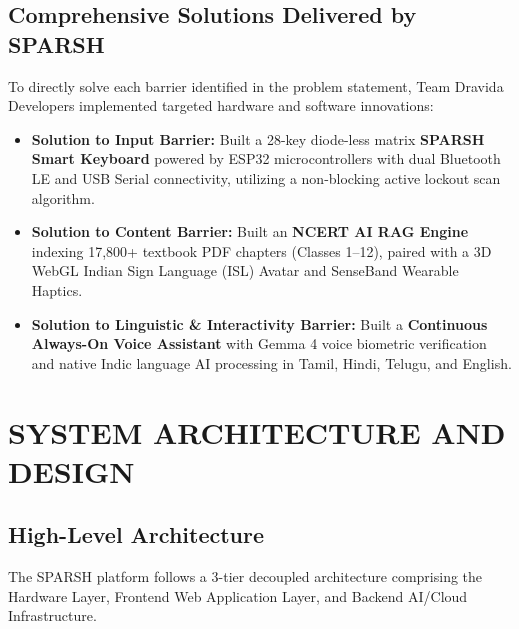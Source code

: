 \documentclass[12pt,a4paper]{report}
\begin{document}
\section{Comprehensive Solutions Delivered by SPARSH}
To directly solve each barrier identified in the problem statement, Team Dravida Developers implemented targeted hardware and software innovations:
\begin{itemize}
    \item \textbf{Solution to Input Barrier:} Built a 28-key diode-less matrix \textbf{SPARSH Smart Keyboard} powered by ESP32 microcontrollers with dual Bluetooth LE and USB Serial connectivity, utilizing a non-blocking active lockout scan algorithm.
    \item \textbf{Solution to Content Barrier:} Built an \textbf{NCERT AI RAG Engine} indexing 17,800+ textbook PDF chapters (Classes 1--12), paired with a 3D WebGL Indian Sign Language (ISL) Avatar and SenseBand Wearable Haptics.
    \item \textbf{Solution to Linguistic \& Interactivity Barrier:} Built a \textbf{Continuous Always-On Voice Assistant} with Gemma 4 voice biometric verification and native Indic language AI processing in Tamil, Hindi, Telugu, and English.
\end{itemize}

\clearpage
\chapter{SYSTEM ARCHITECTURE AND DESIGN}

\section{High-Level Architecture}
The SPARSH platform follows a 3-tier decoupled architecture comprising the Hardware Layer, Frontend Web Application Layer, and Backend AI/Cloud Infrastructure.
\end{document}
